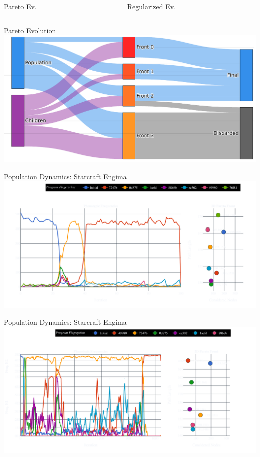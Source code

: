\documentclass[aspectratio=169]{beamer}
\makeatletter
\renewcommand{\emph}[1]{{\Huge \color{pureminimalistic@text@red} #1}}
\makeatother
\begin{document}
\begin{frame}{}
  \begin{columns}[T]
      \begin{column}{.5\linewidth}
        \emph{Pareto Ev.}
      \end{column}
      \begin{column}{.5\linewidth}
        \emph{Regularized Ev.}
      \end{column}
  \end{columns}
\end{frame}

\begin{frame}{Pareto Evolution}
    \includegraphics[width=1.0\linewidth, keepaspectratio]{figures/paretoev.pdf}
\end{frame}

\begin{frame}{Population Dynamics: Starcraft Engima}
    \includegraphics[width=1.0\linewidth, keepaspectratio]{figures/early_pheno.pdf}
\end{frame}

\begin{frame}{Population Dynamics: Starcraft Engima}
    \includegraphics[width=1.0\linewidth, keepaspectratio]{figures/pheno.pdf}
\end{frame}
\end{document}
